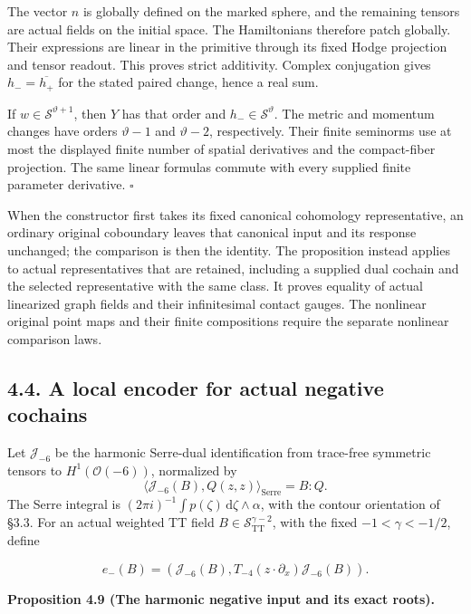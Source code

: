 \documentclass[
  english,
  11pt,
  reqno]{amsart}
\makeatletter
\newcommand{\pandocstatementheading}[1]{%
  \par\addpenalty{\@beginparpenalty}%
  \addvspace{.5\baselineskip plus .2\baselineskip minus .2\baselineskip}%
  {\normalfont\bfseries #1\par}%
  \nobreak\@afterindenttrue\@afterheading
}
\makeatother
\begin{document}
The vector \(n\) is globally defined on the marked sphere, and the
remaining tensors are actual fields on the initial space. The
Hamiltonians therefore patch globally. Their expressions are linear in
the primitive through its fixed Hodge projection and tensor readout.
This proves strict additivity. Complex conjugation gives
\(h_-=\overline{h_+}\) for the stated paired change, hence a real sum.

If \(w\in\mathscr S^{\vartheta+1}\), then \(Y\) has that order and
\(h_-\in\mathscr S^\vartheta\). The metric and momentum changes have
orders \(\vartheta-1\) and \(\vartheta-2\), respectively. Their finite
seminorms use at most the displayed finite number of spatial derivatives
and the compact-fiber projection. The same linear formulas commute with
every supplied finite parameter derivative. \hfill\(\square\)

When the constructor first takes its fixed canonical cohomology
representative, an ordinary original coboundary leaves that canonical
input and its response unchanged; the comparison is then the identity.
The proposition instead applies to actual representatives that are
retained, including a supplied dual cochain and the selected
representative with the same class. It proves equality of actual
linearized graph fields and their infinitesimal contact gauges. The
nonlinear original point maps and their finite compositions require the
separate nonlinear comparison laws.

\subsection{4.4. A local encoder for actual negative
cochains}\label{a-local-encoder-for-actual-negative-cochains}\label{sec:online-negative-harmonic-input}

Let \(\mathscr J_{-6}\) be the harmonic Serre-dual identification from
trace-free symmetric tensors to \(H^1(\mathcal O(-6))\), normalized by
\[
\langle\mathscr J_{-6}(B),Q(z,z)\rangle_{\mathrm{Serre}}=B:Q.
\] The Serre integral is
\((2\pi i)^{-1}\int p(\zeta)\,\mathrm d\zeta\wedge\alpha\), with the
contour orientation of §3.3. For an actual weighted TT field
\(B\in\mathscr S^{\gamma-2}_{\mathrm{TT}}\), with the fixed
\(-1<\gamma<-1/2\), define

\label{eq:online-negative-harmonic-input-cochain} \[
e_-(B)=\left(\mathscr J_{-6}(B),
T_{-4}(z\cdot\partial_x)\mathscr J_{-6}(B)\right).
\] \pandocstatementheading{\leavevmode{}\label{prop:online-negative-harmonic-root-encoder}Proposition 4.9 (The harmonic negative input and its exact roots).}
\end{document}
